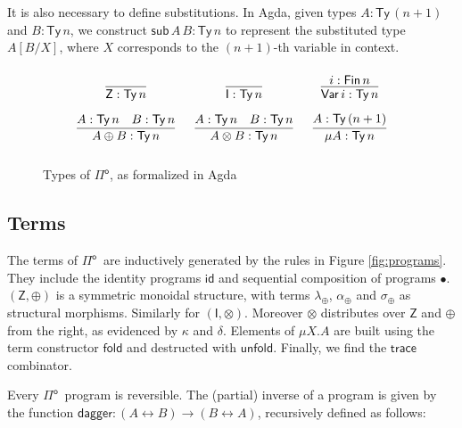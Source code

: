 \documentclass[runningheads,a4paper]{llncs}
\newcommand{\Pio}{\ensuremath{\mathsf{\Pi}^{\mathsf{o}}}}
\newcommand{\Ty}{\mathsf{Ty}}
\newcommand{\Var}{\mathsf{Var}}
\newcommand{\id}{\mathsf{id}}
\newcommand{\lr}{\longleftrightarrow}
\newcommand{\fold}{\mathsf{fold}}
\newcommand{\unfold}{\mathsf{unfold}}
\newcommand{\sub}{\mathsf{sub}}
\newcommand{\trace}{\ensuremath{\mathsf{trace}}}
\newcommand{\Z}{\mathsf{Z}}
\newcommand{\I}{\mathsf{I}}
\renewcommand{\dagger}{\mathsf{dagger}}
\begin{document}
It is also necessary to define substitutions. In Agda, given
types $A : \Ty\,(n+1)$ and $B : \Ty\,n$, we construct
$\sub\,A\,B : \Ty\,n$ to represent the substituted type $A[B/X]$,
where $X$ corresponds to the $(n+1)$-th variable in context.

\begin{figure}[h]
\[
\arraycolsep=8pt\def\arraystretch{2.8}
\begin{array}{ccc}
\infer{\Z : \Ty\,n}{} 
& \infer{\I : \Ty\,n}{}
& \infer{\Var\,i : \Ty\,n}{i : \mathsf{Fin}\,n}  \\
\infer{A \oplus B : \Ty\,n}{A : \Ty\,n & B : \Ty\,n}
& \infer{A \otimes B : \Ty\,n}{A : \Ty\,n & B : \Ty\,n}
& \infer{\mu A : \Ty\,n}{A : \Ty\,(n+1)} 
\end{array}
\]
\caption{Types of \Pio, as formalized in Agda}
\label{fig:types}
\end{figure}


\subsection{Terms}

The terms of \Pio\ are inductively generated by the rules in Figure
\ref{fig:programs}. They include the identity programs $\id$ and
sequential composition of programs $\bullet$. $(\Z,\oplus)$ is a
symmetric monoidal structure, with terms $\lambda_\oplus$,
$\alpha_\oplus$ and $\sigma_\oplus$ as structural
morphisms. Similarly for $(\I,\otimes)$. Moreover $\otimes$
distributes over $\Z$ and $\oplus$ from the right, as evidenced by  $\kappa$
and $\delta$. Elements of $\mu X.A$ are built using the term
constructor $\fold$ and destructed with $\unfold$. Finally, we find the
$\trace$ combinator. 




Every \Pio\ program is reversible. The (partial) inverse of a program is given by
the function $\dagger : (A \lr B) \to (B \lr A)$, recursively defined
as follows:
\end{document}
